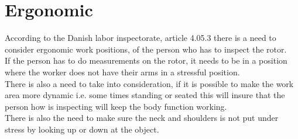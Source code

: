 \section{Ergonomic}
According to the Danish labor inspectorate, article 4.05.3 there is a need to consider ergonomic work positions, of the person who has to inspect the rotor.\\
If the person has to do measurements on the rotor, it needs to be in a position where the worker does not have their arms in a stressful position.\\
There is also a need to take into consideration, if it is possible to make the work area more dynamic i.e. some times standing or seated this will insure that the person how is inspecting will keep the body function working.\\
There is also the need to make sure the neck and shoulders is not put under stress by looking up or down at the object\cite{ATpostions}.